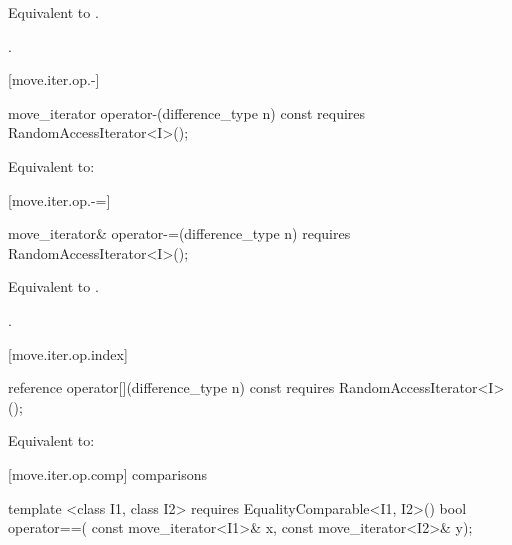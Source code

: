 \begin{itemdescr}
\pnum
\effects Equivalent to .

\pnum
\returns {}.
\end{itemdescr}

[move.iter.op.-]{}

%
%
\begin{itemdecl}
move_iterator operator-(difference_type n) const
  requires RandomAccessIterator<I>();
\end{itemdecl}

\begin{itemdescr}
\pnum
\effects Equivalent to:
\end{itemdescr}

[move.iter.op.-=]{}

%
%
\begin{itemdecl}
move_iterator& operator-=(difference_type n)
  requires RandomAccessIterator<I>();
\end{itemdecl}

\begin{itemdescr}
\pnum
\effects Equivalent to .

\pnum
\returns {}.
\end{itemdescr}

[move.iter.op.index]{}

%
%
\begin{itemdecl}
reference operator[](difference_type n) const
  requires RandomAccessIterator<I>();
\end{itemdecl}

\begin{itemdescr}
\pnum
\effects Equivalent to:
\end{itemdescr}

[move.iter.op.comp]{ comparisons}

%
%
\begin{itemdecl}
template <class I1, class I2>
    requires EqualityComparable<I1, I2>()
  bool operator==(
    const move_iterator<I1>& x, const move_iterator<I2>& y);
\end{itemdecl}

